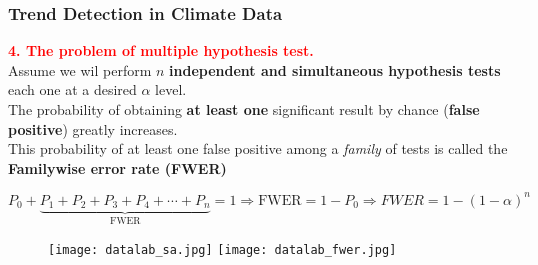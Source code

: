 \documentclass[11pt]{beamer}
\begin{document}
\begin{frame}
  \frametitle{\normalsize{\textbf{
    Trend Detection in Climate Data  
  }}} 

  \scriptsize{  

    \textbf{\textcolor{red}{
      4. The problem of multiple hypothesis test.
    }} \\[0.10cm]

    \textbullet \: Assume we wil perform $n$ \textbf{independent and
     simultaneous hypothesis tests} each one at a desired $\alpha$ level. \\[0.10cm] 

    \textbullet \: The probability of obtaining \textbf{at least one} 
    significant result by chance (\textbf{false positive}) greatly increases. \\[0.10cm]

    \textbullet \: This probability of at least one false positive
    among a \emph{family} of tests is called the 
    \textbf{Familywise error rate (FWER)} 

    \begin{equation*}
      P_0 + \underbrace{P_1 + P_2 + P_3 + P_4 + \cdots + P_n}_{\text{FWER}} = 1 
      \Rightarrow \text{FWER} = 1 - P_0  
      \Rightarrow \boxed{FWER = 1 - (1 - \alpha)^n}
    \end{equation*}

    \begin{figure}[h!]
      \centering
      \texttt{[image: datalab\_sa.jpg]}
      \texttt{[image: datalab\_fwer.jpg]}
    \end{figure}

  }
\end{frame}
\end{document}
